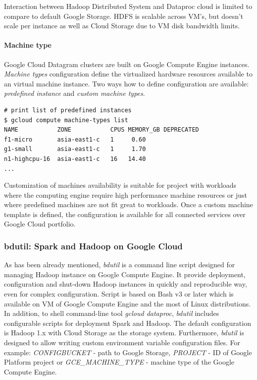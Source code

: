 \documentclass[a4paper,12pt,oneside]{report}
\begin{document}
	Interaction between Hadoop Distributed System and Dataproc cloud is limited to
	compare to default Google Storage. HDFS is scalable across VM’s, but doesn’t scale per instance as
	 well as Cloud Storage due to VM disk bandwidth limits. 
	
	\paragraph{Machine type} Google Cloud Datagram clusters are built on Google
	Compute Engine instances. \textit{Machine types} configuration define the virtualized hardware
	 resources	available to an  virtual machine instance. Two ways how to define configuration are 
	 available: \textit{predefined instance} and \textit{custom machine types}.  
	
	\begin{footnotesize}
		\begin{lstlisting}[style=mybash]
# print list of predefined instances
$ gcloud compute machine-types list
NAME           ZONE           CPUS MEMORY_GB DEPRECATED
f1-micro       asia-east1-c   1     0.60
g1-small       asia-east1-c   1     1.70
n1-highcpu-16  asia-east1-c   16   14.40
...
		\end{lstlisting}
	\end{footnotesize}
	
	Customization of machines availability is suitable for project with workloads
	where the computing	engine require high performance machine resources or just where predefined
	machines are not fit great to workloads. Once a custom machine template is 
	defined, the configuration is available for all connected services over Google
	Cloud portfolio.
	
	\subsubsection{bdutil: Spark and Hadoop on Google Cloud}\label{subsub:bdutil}
	As has been already mentioned, \textit{bdutil} is a command line script designed
	for	managing Hadoop instance on Google Compute Engine. It provide deployment,
	configuration	and shut-down Hadoop instances in quickly and reproducible way, even for complex
	configuration. 	Script is based on Bash v3 or later which is available on VM of Google Compute
	Engine  and the most of Linux distributions. In addition, to shell command-line tool
	\textit{gcloud dataproc}, \textit{bdutil} includes configurable scripts
	for deployment 	Spark and Hadoop. The default configuration is Hadoop 1.x with Cloud Storage as
	the storage system. Furthermore, \textit{bdutil} is designed to allow writing custom environment
	variable configuration 	files. For example: \emph{CONFIGBUCKET} - path to Google Storage, \emph{PROJECT}	
	- ID of Google Platform project or \emph{GCE\_MACHINE\_TYPE} - machine type of the Google Compute Engine.
	
\end{document}
